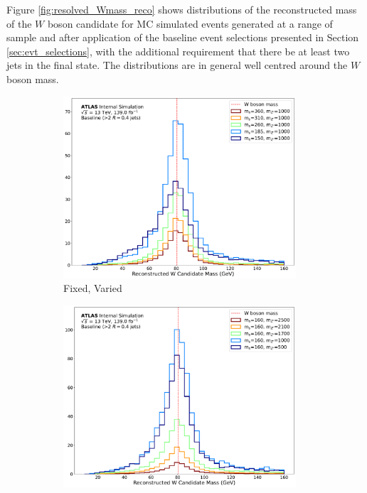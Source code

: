 Figure \ref{fig:resolved_Wmass_reco} shows distributions of the reconstructed mass of the \(W\) boson candidate for MC simulated events generated at a range of sample \ms and \mZp after application of the baseline event selections presented in Section \ref{sec:evt_selections}, with the additional requirement that there be at least two \SmallR jets in the final state. The distributions are in general well centred around the \(W\) boson mass.

\begin{figure}[h]
	\centering
	\begin{subfigure}[b]{0.49\textwidth}
	\includegraphics[width=0.95\textwidth]{Figures/5/WCand_m_ms.pdf}
	\caption{\mZp Fixed, \ms Varied}
	\label{fig:resolved_Wmass_reco_ms}
	\end{subfigure}
	\begin{subfigure}[b]{0.49\textwidth}
	\includegraphics[width=0.95\textwidth]{Figures/5/WCand_m_mZp.pdf}

\end{subfigure}
\end{figure}
